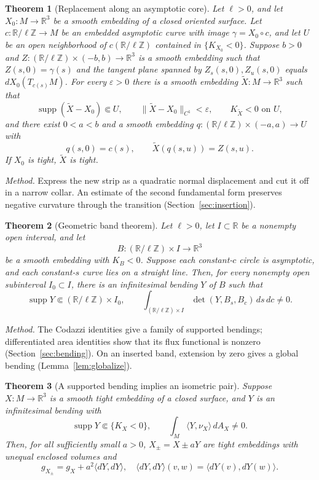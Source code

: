 \documentclass[11pt]{amsart}
\newtheorem{theorem}{Theorem}[section]
\theoremstyle{definition}
\newcommand{\R}{\mathbb R}
\DeclareMathOperator{\supp}{supp}
\begin{document}
\begin{theorem}[Replacement along an asymptotic core]
\label{prop:insert}
Let $\ell>0$, and let $X_0:M\to\R^3$ be a smooth embedding of a closed
oriented surface. Let $c:\R/\ell\mathbb Z\to M$ be an embedded asymptotic
curve with image $\gamma=X_0\circ c$, and let $U$ be an open
neighborhood of $c(\R/\ell\mathbb Z)$ contained in
$\{K_{X_0}<0\}$.
Suppose $b>0$ and
$Z:(\R/\ell\mathbb Z)\times(-b,b)\to\R^3$ is a smooth embedding
such that $Z(s,0)=\gamma(s)$ and the tangent plane spanned by
$Z_s(s,0),Z_u(s,0)$ equals $dX_0(T_{c(s)}M)$.
For every $\varepsilon>0$ there is a smooth embedding
$\widetilde X:M\to\R^3$ such that
\[
 \supp(\widetilde X-X_0)\Subset U,\qquad
 \|\widetilde X-X_0\|_{C^1}<\varepsilon,\qquad
 K_{\widetilde X}<0\text{ on }U,
\]
and there exist $0<a<b$ and a smooth embedding
$q:(\R/\ell\mathbb Z)\times(-a,a)\to U$ with
\[
 q(s,0)=c(s),\qquad \widetilde X(q(s,u))=Z(s,u).
\]
If $X_0$ is tight, $\widetilde X$ is tight.
\end{theorem}

\emph{Method.} Express the new strip as a quadratic normal
displacement and cut it off in a narrow collar. An estimate of the
second fundamental form preserves negative curvature through the
transition (Section~\ref{sec:insertion}).

\begin{theorem}[Geometric band theorem]\label{thm:band-bending}
Let $\ell>0$, let $I\subset\R$ be a nonempty open interval, and let
\[
 B:(\R/\ell\mathbb Z)\times I\longrightarrow\R^3
\]
be a smooth embedding with $K_B<0$. Suppose each constant-$c$
circle is asymptotic, and each constant-$s$ curve lies on a straight
line. Then, for every nonempty open subinterval $I_0\subset I$,
there is an infinitesimal bending $Y$ of $B$ such that
\[
 \supp Y\Subset(\R/\ell\mathbb Z)\times I_0,\qquad
 \int_{(\R/\ell\mathbb Z)\times I}
                \det(Y,B_s,B_c)\,ds\,dc\ne0.
\]
\end{theorem}

\emph{Method.} The Codazzi identities give a family of supported
bendings; differentiated area identities show that its flux
functional is nonzero (Section~\ref{sec:bending}). On an inserted
band, extension by zero gives a global bending
(Lemma~\ref{lem:globalize}).

\begin{theorem}[A supported bending implies an isometric pair]
\label{prop:pair}
Suppose $X:M\to\R^3$ is a smooth tight embedding of a closed surface,
and $Y$ is an infinitesimal bending with
\[
 \supp Y\Subset\{K_X<0\},\qquad
 \int_M\langle Y,\nu_X\rangle\,dA_X\ne0.
\]
Then, for all sufficiently small $a>0$, $X_\pm=X\pm aY$ are tight
embeddings with unequal enclosed volumes and
\begin{equation}\label{eq:exact-metric}
 g_{X_\pm}=g_X+a^2\langle dY,dY\rangle,
 \quad
 \langle dY,dY\rangle(v,w)=\langle dY(v),dY(w)\rangle.
\end{equation}
\end{theorem}
\end{document}
